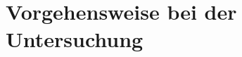 \documentclass[a4paper, 12pt, listof=totoc, bibliography=totoc]{scrreprt}
\begin{document}
%

\section{Vorgehensweise bei der Untersuchung}



\end{document}
